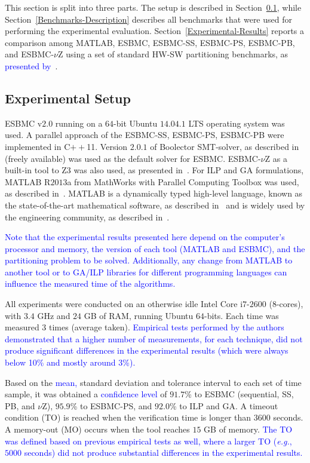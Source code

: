 \documentclass{doublecol-new}
\theoremstyle{TH}{
\newtheorem{lemma}{Lemma}
\newtheorem{theorem}[lemma]{Theorem}
\newtheorem{corrolary}[lemma]{Corrolary}
\newtheorem{conjecture}[lemma]{Conjecture}
\newtheorem{proposition}[lemma]{Proposition}
\newtheorem{claim}[lemma]{Claim}
\newtheorem{stheorem}[lemma]{Wrong Theorem}
\newtheorem{algorithm}{Algorithm}
}
\theoremstyle{THrm}{
\newtheorem{definition}{Definition}[section]
\newtheorem{question}{Question}[section]
\newtheorem{remark}{Remark}
\newtheorem{scheme}{Scheme}
}
\theoremstyle{THhit}{
\newtheorem{case}{Case}[section]
}
\begin{document}
This section is split into three parts. The setup is described in Section~\ref{Experimental-Setup}, while Section~\ref{Benchmarks-Description} describes all benchmarks that were used for performing the experimental evaluation. Section~\ref{Experimental-Results} reports a comparison among MATLAB, ESBMC, ESBMC-SS, ESBMC-PS, ESBMC-PB, and ESBMC-$\nu$Z using a set of standard HW-SW partitioning benchmarks, as \textcolor{blue}{presented by}~\cite{Mann2007}.

\subsection{Experimental Setup}
\label{Experimental-Setup}

ESBMC v$2$.$0$ running on a $64$-bit Ubuntu $14$.$04$.$1$ LTS operating system was used. A parallel approach of the ESBMC-SS, ESBMC-PS, ESBMC-PB were implemented in C$++$11. Version $2$.$0$.$1$ of Boolector SMT-solver, as described in~\cite{Brummayer2009} (freely available) was used as the default solver for ESBMC. ESBMC-$\nu$Z as a built-in tool to Z3 was also used, as presented in~\cite{Bjorner2014}. For ILP and GA formulations, MATLAB R$2013$a from MathWorks with Parallel Computing Toolbox was used, as described in~\cite{TheMathWorks2013}. MATLAB is a dynamically typed high-level language, known as the state-of-the-art mathematical software, as described in~\cite{Tranquillo2011} and is widely used by the engineering community, as described in~\cite{Hong2010}.

\textcolor{blue}{Note that the experimental results presented here depend on the computer's processor and memory, the version of each tool (MATLAB and ESBMC), and the partitioning problem to be solved. Additionally, any change from MATLAB to another tool or to GA/ILP libraries for different programming languages can influence the measured time of the algorithms.}

All experiments were conducted on an otherwise idle Intel Core i$7$-$2600$ ($8$-cores), with $3$.$4$ GHz and $24$ GB of RAM, running Ubuntu $64$-bits. Each time was measured $3$ times (average taken). \textcolor{blue}{Empirical tests performed by the authors demonstrated that a higher number of measurements, for each technique, did not produce significant differences in the experimental results (which were always below 10\% and mostly around 3\%).}

Based on the \textcolor{blue}{mean,} standard deviation and tolerance interval to each set of time sample, it was obtained a \textcolor{blue}{confidence level} of $91.7$\% to ESBMC (sequential, SS, PB, and $\nu$Z), $95.9$\% to ESBMC-PS, and $92.0$\% to ILP and GA. A timeout condition (TO) is reached when the verification time is longer than $3600$ seconds. A memory-out (MO) occurs when the tool reaches $15$ GB of memory. \textcolor{blue}{The TO was defined based on previous empirical tests as well, where a larger TO ({\it e.g.}, $5000$ seconds) did not produce substantial differences in the experimental results.} 
\end{document}
